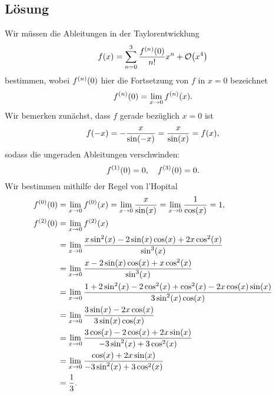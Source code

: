 \documentclass{exercise}
\begin{document}
    \subsection*{Lösung}
    Wir müssen die Ableitungen in der Taylorentwicklung
    \[
        f\parentheses*{x} = \sum_{n = 0}^3\frac{f^{\parentheses*{n}}\parentheses*{0}}{n!}x^n + \mathcal{O}\parentheses*{x^4}
    \]
    bestimmen, wobei \(f^{\parentheses*{n}}\parentheses*{0}\) hier die Fortsetzung von \(f\) in \(x = 0\) bezeichnet
    \[
        f^{\parentheses*{n}}\parentheses*{0} = \lim_{x \to 0}f^{\parentheses*{n}}\parentheses*{x}.
    \]
    Wir bemerken zunächst, dass \(f\) gerade bezüglich \(x = 0\) ist
    \[
        f\parentheses*{-x} = -\frac{x}{\sin\parentheses*{-x}} = \frac{x}{\sin\parentheses*{x}} = f\parentheses*{x},
    \]
    sodass die ungeraden Ableitungen verschwinden:
    \[
        f^{\parentheses*{1}}\parentheses*{0} = 0, \quad f^{\parentheses*{3}}\parentheses*{0} = 0.
    \]
    Wir bestimmen mithilfe der Regel von l'Hopital
    \begin{align*}
        f^{\parentheses*{0}}\parentheses*{0} &= \lim_{x \to 0}f^{\parentheses*{0}}\parentheses*{x} = \lim_{x \to 0}\frac{x}{\sin\parentheses*{x}} = \lim_{x \to 0}\frac{1}{\cos\parentheses*{x}} = 1,\\
        f^{\parentheses*{2}}\parentheses*{0} &= \lim_{x \to 0}f^{\parentheses*{2}}\parentheses*{x}\\
        &= \lim_{x \to 0}\frac{x\sin^2\parentheses*{x} - 2\sin\parentheses*{x}\cos\parentheses*{x} + 2x\cos^2\parentheses*{x}}{\sin^3\parentheses*{x}}\\
        &= \lim_{x \to 0}\frac{x - 2\sin\parentheses*{x}\cos\parentheses*{x} + x\cos^2\parentheses*{x}}{\sin^3\parentheses*{x}}\\
        &= \lim_{x \to 0}\frac{1 + 2\sin^2\parentheses*{x} - 2\cos^2\parentheses*{x} + \cos^2\parentheses*{x} - 2x\cos\parentheses*{x}\sin\parentheses*{x}}{3\sin^2\parentheses*{x}\cos\parentheses*{x}}\\
        &= \lim_{x \to 0}\frac{3\sin\parentheses*{x} - 2x\cos\parentheses*{x}}{3\sin\parentheses*{x}\cos\parentheses*{x}}\\
        &= \lim_{x \to 0}\frac{3\cos\parentheses*{x} -2\cos\parentheses*{x} + 2x\sin\parentheses*{x}}{-3\sin^2\parentheses*{x} + 3\cos^2\parentheses*{x}}\\
        &= \lim_{x \to 0}\frac{\cos\parentheses*{x} + 2x\sin\parentheses*{x}}{-3\sin^2\parentheses*{x} + 3\cos^2\parentheses*{x}}\\
        &= \frac{1}{3}.
    \end{align*}
\end{document}
